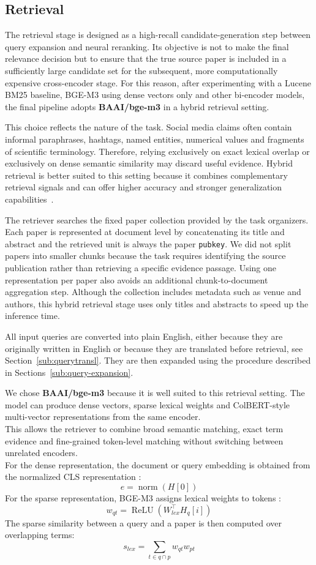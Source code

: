 \subsection{Retrieval} \label{sub:retrieval}
The retrieval stage is designed as a high-recall candidate-generation step between query expansion and neural reranking. Its objective is not to make the final relevance decision but to ensure that the true source paper is included in a sufficiently large candidate set for the subsequent, more computationally expensive cross-encoder stage. For this reason, after experimenting with a Lucene BM25 baseline, BGE-M3 using dense vectors only and other bi-encoder models, the final pipeline adopts \textbf{BAAI/bge-m3} in a hybrid retrieval setting.

This choice reflects the nature of the task. Social media claims often contain informal paraphrases, hashtags, named entities, numerical values and fragments of scientific terminology. Therefore, relying exclusively on exact lexical overlap or exclusively on dense semantic similarity may discard useful evidence. Hybrid retrieval is better suited to this setting because it combines complementary retrieval signals and can offer higher accuracy and stronger generalization capabilities~\cite{bge-m3}.

The retriever searches the fixed paper collection provided by the task organizers. Each paper is represented at document level by concatenating its title and abstract and the retrieved unit is always the paper \texttt{pubkey}. We did not split papers into smaller chunks because the task requires identifying the source publication rather than retrieving a specific evidence passage. Using one representation per paper also avoids an additional chunk-to-document aggregation step. Although the collection includes metadata such as venue and authors, this hybrid retrieval stage uses only titles and abstracts to speed up the inference time.

All input queries are converted into plain English, either because they are originally written in English or because they are translated before retrieval, see Section~\ref{sub:querytransl}. They are then expanded using the procedure described in Sections~\ref{sub:query-expansion}.

We chose \textbf{BAAI/bge-m3} because it is well suited to this retrieval setting. The model can produce dense vectors, sparse lexical weights and ColBERT-style multi-vector representations from the same encoder.\\
This allows the retriever to combine broad semantic matching, exact term evidence and fine-grained token-level matching without switching between unrelated encoders.\\
For the dense representation, the document or query embedding is obtained from the normalized
CLS representation \cite{chen2024bgem3}:
\[
e=\operatorname{norm}(H[0])
\]
For the sparse representation, BGE-M3 assigns lexical weights to tokens \cite{bge_m3_docs}:
\[
w_{qt}=\operatorname{ReLU}(W_{lex}^\top H_q[i])
\]
The sparse similarity between a query and a paper is then computed over overlapping terms:
\[
s_{lex}=\sum_{t\in q\cap p} w_{qt}w_{pt}
\]


